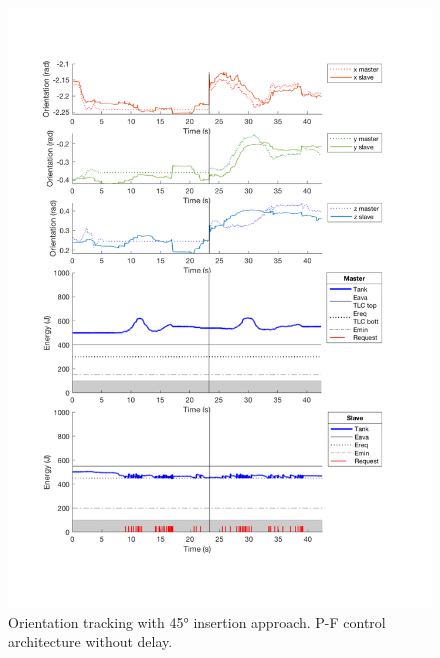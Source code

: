 \begin{center}
	\begin{figure}
		\includegraphics[width=\textwidth, keepaspectratio]{plots/pf45/Orientation.pdf}
		\caption{Orientation tracking with 45° insertion approach. P-F control architecture without delay.}
		\label{graph:pf45/Orientation}
	\end{figure}
\end{center}
